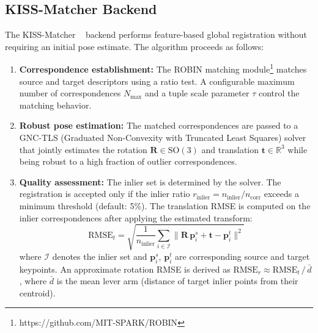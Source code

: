 \subsection{KISS-Matcher Backend}
\label{sec:kiss_matcher}

The KISS-Matcher ~\cite{KISSMATCHER} backend performs feature-based global registration without
requiring an initial pose estimate.
The algorithm proceeds as follows:

\begin{enumerate}
    \item \textbf{Correspondence establishment:}
          The ROBIN matching module\footnote{https://github.com/MIT-SPARK/ROBIN} matches source and target
          descriptors using a ratio test.
          A configurable maximum number of correspondences
          $N_\mathrm{max}$ and a tuple scale parameter $\tau$ control the
          matching behavior.

    \item \textbf{Robust pose estimation:}
          The matched correspondences are passed to a GNC-TLS
          (Graduated Non-Convexity with Truncated Least Squares) solver
          that jointly estimates the rotation $\mathbf{R} \in \mathrm{SO}(3)$
          and translation $\mathbf{t} \in \mathbb{R}^3$ while being robust
          to a high fraction of outlier correspondences.

    \item \textbf{Quality assessment:}
          The inlier set is determined by the solver.
          The registration is accepted only if the inlier ratio
          $r_\mathrm{inlier} = n_\mathrm{inlier} / n_\mathrm{corr}$
          exceeds a minimum threshold (default: 5\%).
          The translation RMSE is computed on the inlier correspondences
          after applying the estimated transform:
          \begin{equation}
              \mathrm{RMSE}_t = \sqrt{
                  \frac{1}{n_\mathrm{inlier}}
                  \sum_{i \in \mathcal{I}}
                  \lVert \mathbf{R}\,\mathbf{p}_i^s + \mathbf{t} - \mathbf{p}_i^t \rVert^2
              }
          \end{equation}
          where $\mathcal{I}$ denotes the inlier set and $\mathbf{p}_i^s$,
          $\mathbf{p}_i^t$ are corresponding source and target keypoints.
          An approximate rotation RMSE is derived as
          $\mathrm{RMSE}_r \approx \mathrm{RMSE}_t \,/\, \bar{d}$,
          where $\bar{d}$ is the mean lever arm (distance of target inlier
          points from their centroid).
\end{enumerate}

